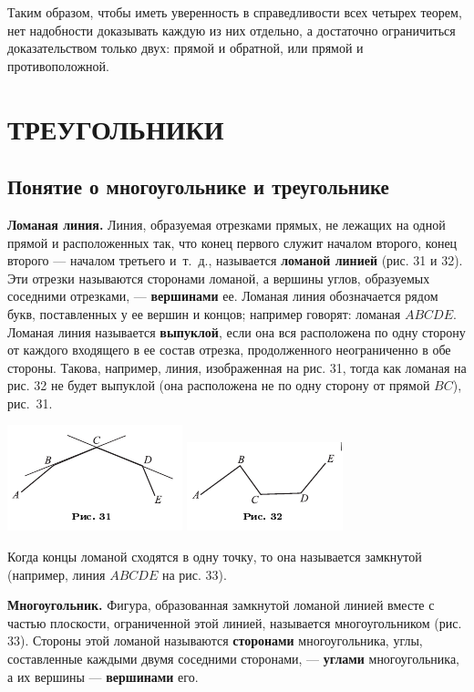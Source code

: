 \documentclass[oneside]{book}
\begin{document}
Таким образом, чтобы иметь уверенность в справедливости всех четырех теорем, нет надобности доказывать каждую из них отдельно, а достаточно ограничиться доказательством только двух:
прямой и обратной, или прямой и противоположной.

\section{ТРЕУГОЛЬНИКИ}

\subsection*{Понятие о многоугольнике и треугольнике}

\textbf{Ломаная линия.}
Линия, образуемая отрезками прямых, не лежащих на одной прямой и расположенных так, что конец первого служит началом второго, конец второго — началом третьего и~т.~д., называется \textbf{ломаной линией} (рис. 31 и 32).
Эти отрезки называются сторонами ломаной, а вершины углов, образуемых соседними отрезками, — \textbf{вершинами} ее.
Ломаная линия обозначается рядом букв, поставленных у ее вершин и концов;
например говорят:
ломаная $ABCDE$.
Ломаная линия называется \textbf{выпуклой}, если она вся расположена по одну сторону от каждого входящего в ее состав отрезка, продолженного неограниченно в обе стороны.
Такова, например, линия, изображенная на рис. 31, тогда как ломаная на рис. 32 не будет выпуклой (она расположена не по одну сторону от прямой $BC$), рис.~31.

\includegraphics{pics/ris-31}
\includegraphics{pics/ris-32}

Когда концы ломаной сходятся в одну точку, то она называется замкнутой (например, линия $ABCDE$ на рис. 33).

\textbf{Многоугольник.}
Фигура, образованная замкнутой ломаной линией вместе с частью плоскости, ограниченной этой линией, называется многоугольником (рис. 33).
Стороны этой ломаной называются \textbf{сторонами} многоугольника, углы, составленные каждыми двумя соседними сторонами, — \textbf{углами} многоугольника, а их вершины — \textbf{вершинами} его.
\end{document}
